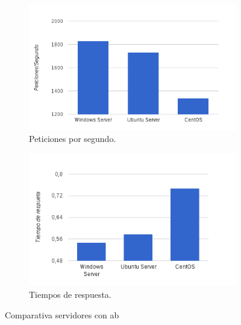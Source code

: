 \begin{figure}[H]
    \centering
    \begin{subfigure}[b]{0.45\textwidth}
        \includegraphics[width=\textwidth]{imagenes/g1}
        \caption{Peticiones por segundo.}
    \end{subfigure}
    \begin{subfigure}[b]{0.45\textwidth}
        \includegraphics[width=\textwidth]{imagenes/g2}
        \caption{Tiempos de respuesta.}
    \end{subfigure}
    \caption{Comparativa servidores con ab}
    \label{fig6}
\end{figure}

